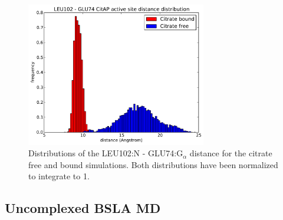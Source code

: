 \documentclass[english, a4paper, 12pt, titlepage, draft]{article}
\begin{document}
\begin{figure}
    \centering
    \includegraphics[width=0.7\textwidth]{figures/CitAP_opening/CitAP_dist_hist_both.pdf}
    \caption{Distributions of the LEU102:N - GLU74:G$_{\alpha}$ distance for the citrate free and bound simulations.
    Both distributions have been normalized to integrate to 1.}
    \label{fig:CitAP_dist_hist}
\end{figure}         




\subsection{Uncomplexed BSLA MD}
\end{document}
